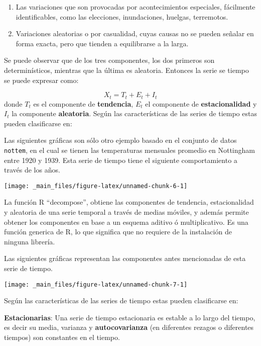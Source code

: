 \documentclass[
  a4paper,
  oneside,
  openany]{book}
\providecommand{\tightlist}{%
  \setlength{\itemsep}{0pt}\setlength{\parskip}{0pt}}
\begin{document}
\begin{enumerate}
  \begin{enumerate}
  \def\labelenumii{\alph{enumii})}
  \tightlist
  \item
    Las variaciones que son provocadas por acontecimientos especiales, fácilmente identificables, como las elecciones, inundaciones, huelgas, terremotos.
  \item
    Variaciones aleatorias o por casualidad, cuyas causas no se pueden señalar en forma exacta, pero que tienden a equilibrarse a la larga.
  \end{enumerate}
\end{enumerate}

Se puede observar que de los tres componentes, los dos primeros son determinísticos, mientras que la última es aleatoria. Entonces la serie se tiempo se puede expresar como:

\[X_{t}=T_{t}+E_{t}+I_{t}\]
donde \(T_{t}\) es el componente de \textbf{tendencia}, \(E_{t}\) el componente de \textbf{estacionalidad} y \(I_{t}\) la componente \textbf{aleatoria}.
Según las características de las series de tiempo estas pueden clasificarse en:

Las siguientes gráficas son sólo otro ejemplo basado en el conjunto de datos \texttt{nottem}, en el cual se tienen las temperaturas mensuales promedio en Nottingham entre 1920 y 1939. Esta serie de tiempo tiene el siguiente comportamiento a través de los años.

\begin{center}\texttt{[image: \_main\_files/figure-latex/unnamed-chunk-6-1]} \end{center}

La función R ``decompose'', obtiene las componentes de tendencia, estacionalidad y aleatoria de una serie temporal a través de medias móviles, y además permite obtener los componentes en base a un esquema aditivo ó multiplicativo. Es una función generica de R, lo que significa que no requiere de la instalación de ninguna librería.

Las siguientes gráficas representan las componentes antes mencionadas de esta serie de tiempo.

\begin{center}\texttt{[image: \_main\_files/figure-latex/unnamed-chunk-7-1]} \end{center}

Según las características de las series de tiempo estas pueden clasificarse en:

\textbf{Estacionarias}: Una serie de tiempo estacionaria es estable a lo largo del tiempo, es decir su media, varianza y \textbf{autocovarianza} (en diferentes rezagos o diferentes tiempos) son constantes en el tiempo.
\end{document}
